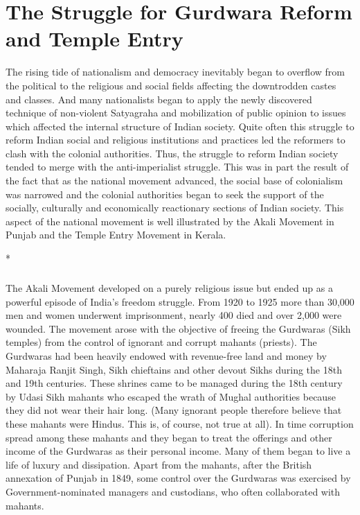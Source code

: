 \chapter[Struggle for Gurdwara Reform and Temple Entry]{The Struggle for Gurdwara Reform and Temple Entry}
\begin{multicols}{2}

The rising tide of nationalism and democracy inevitably began to overflow from the political to the religious and social fields affecting the downtrodden castes and classes. And many nationalists began to apply the newly discovered technique of non-violent Satyagraha and mobilization of public opinion to issues which affected the internal structure of Indian society. Quite often this struggle to reform Indian social and religious institutions and practices led the reformers to clash with the colonial authorities. Thus, the struggle to reform Indian society tended to merge with the anti-imperialist struggle. This was in part the result of the fact that as the national movement advanced, the social base of colonialism was narrowed and the colonial authorities began to seek the support of the socially, culturally and economically reactionary sections of Indian society. This aspect of the national movement is well illustrated by the Akali Movement in Punjab and the Temple Entry Movement in Kerala.

\begin{center}*\end{center}

\paragraph*{}
The Akali Movement developed on a purely religious issue but ended up as a powerful episode of India's freedom struggle. From 1920 to 1925 more than 30,000 men and women underwent imprisonment, nearly 400 died and over 2,000 were wounded. The movement arose with the objective of freeing the Gurdwaras (Sikh temples) from the control of ignorant and corrupt mahants (priests). The Gurdwaras had been heavily endowed with revenue-free land and money by Maharaja Ranjit Singh, Sikh chieftains and other devout Sikhs during the 18th and 19th centuries. These shrines came to be managed during the 18th century by Udasi Sikh mahants who escaped the wrath of Mughal authorities because they did not wear their hair long. (Many ignorant people therefore believe that these mahants were Hindus. This is, of course, not true at all). In time corruption spread among these mahants and they began to treat the offerings and other income of the Gurdwaras as their personal income. Many of them began to live a life of luxury and dissipation. Apart from the mahants, after the British annexation of Punjab in 1849, some control over the Gurdwaras was exercised by Government-nominated managers and custodians, who often collaborated with mahants.


\end{multicols}
